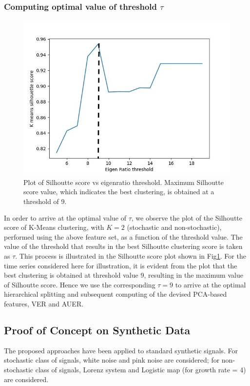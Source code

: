 \documentclass[journal]{IEEEtran}
\begin{document}
	\subsubsection{ Computing optimal value of threshold $\tau$} \label{compute_threshold}

		\begin{figure}[ht]
		\centering
		\includegraphics[width=0.8\linewidth]{threshold_vs_silhoutte_score_peak.jpg}
		\caption{Plot of Silhoutte score vs eigenratio threshold. Maximum Silhoutte score value, which indicates the best clustering, is obtained at a threshold of 9.}
		\label{sill}
	\end{figure}



	In order to arrive at the optimal value of $\tau$, we observe  the plot of the Silhoutte score of K-Means clustering, with $K=2$ (stochastic and non-stochastic), performed using the above feature set, as a function of the threshold value. The value of the threshold that results in the best Silhoutte clustering score is taken as $\tau$. This process is illustrated in the Silhoutte score plot shown in Fig\ref{sill}. For the time series considered here for illustration, it is evident from the plot that the best clustering is obtained at threshold value 9, resulting in the maximum value of Silhoutte score. Hence we use the corresponding $\tau = 9$ to arrive at the optimal hierarchical splitting and subsequent computing of the devised PCA-based features, VER and AUER.

	\subsection{Proof of Concept on Synthetic Data}
	The proposed approaches have been applied to standard synthetic signals. For stochastic class of signals, white noise and pink noise are considered; for non-stochastic class of signals, Lorenz system and Logistic map (for growth rate = 4) are considered.
	
\end{document}
